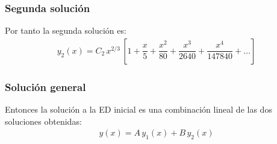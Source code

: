 \begin{frame}
\frametitle{Segunda solución}
Por tanto la segunda solución es:
\begin{align*}
y_{2}(x) = C_{2} \, x^{2/3} \, \left[ 1 + \dfrac{x}{5} + \dfrac{x^{2}}{80} + \dfrac{x^{3}}{2640} + \dfrac{x^{4}}{147840} + \ldots \right]
\end{align*}
\end{frame}
\begin{frame}
\frametitle{Solución general}
Entonces la solución a la ED inicial es una combinación lineal de las dos soluciones obtenidas:
\begin{align*}
y(x) =  A \, y_{1}(x) + B \, y_{2}(x)
\end{align*}
\end{frame}
